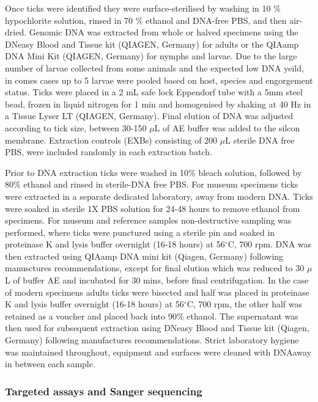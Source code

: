 \documentclass[a4paper, nobind]{templates/ociamthesis}
\begin{document}
Once ticks were identified they were surface-sterilised by washing in 10 \% hypochlorite solution, rinsed in 70 \% ethanol and DNA-free PBS, and then air-dried. Genomic DNA was extracted from whole or halved specimens using the DNeasy Blood and Tissue kit (QIAGEN, Germany) for adults or the QIAamp DNA Mini Kit (QIAGEN, Germany) for nymphs and larvae.
Due to the large number of larvae collected from some animals and the expected low DNA yeild, in comes cases up to 5 larvae were pooled based on host, species and engorgement status.
Ticks were placed in a 2 mL safe lock Eppendorf tube with a 5mm steel bead, frozen in liquid nitrogen for 1 min and homogenised by shaking at 40 Hz in a Tissue Lyser LT (QIAGEN, Germany). Final elution of DNA was adjusted according to tick size, between 30-150 \(\mu\)L of AE buffer was added to the silcon membrane.
Extraction controls (EXBs) consisting of 200 \(\mu\)L sterile DNA free PBS, were included randomly in each extraction batch.

Prior to DNA extraction ticks were washed in 10\% bleach solution, followed by 80\% ethanol and rinsed in sterile-DNA free PBS. For museum specimens ticks were extracted in a separate dedicated laboratory, away from modern DNA. Ticks were soaked in sterile 1X PBS solution for 24-48 hours to remove ethanol from specimens. For museum and reference samples non-destructive sampling was performed, where ticks were punctured using a sterile pin and soaked in proteinase K and lysis buffer overnight (16-18 hours) at 56\(^\circ\)C, 700 rpm.
DNA was then extracted using QIAamp DNA mini kit (Qiagen, Germany) following manusctures recommendations, except for final elution which was reduced to 30 \(\mu\)L of buffer AE and incubated for 30 mins, before final centrifugation.
In the case of modern specimens adults ticks were bisected and half was placed in proteinase K and lysis buffer overnight (16-18 hours) at 56\(^\circ\)C, 700 rpm, the other half was retained as a voucher and placed back into 90\% ethanol.
The supernatant was then used for subsequent extraction using DNeasy Blood and Tissue kit (Qiagen, Germany) following manufactures recommendations. Strict laboratory hygiene was maintained throughout, equipment and surfaces were cleaned with DNAaway in between each sample.

\hypertarget{targeted-assays-and-sanger-sequencing}{%
\subsubsection{Targeted assays and Sanger sequencing}\label{targeted-assays-and-sanger-sequencing}}
\end{document}
